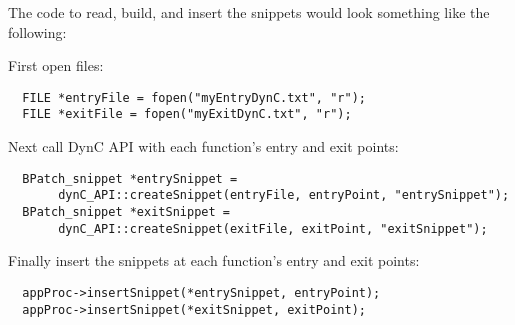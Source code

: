 \documentclass{article}
\begin{document}

\noindent The code to read, build, and insert the snippets would look something like the following:

\noindent First open files:
\begin{lstlisting}
  FILE *entryFile = fopen("myEntryDynC.txt", "r");
  FILE *exitFile = fopen("myExitDynC.txt", "r");
\end{lstlisting}

\noindent Next call DynC API with each function's entry and exit points:
\begin{lstlisting}
  BPatch_snippet *entrySnippet = 
       dynC_API::createSnippet(entryFile, entryPoint, "entrySnippet");
  BPatch_snippet *exitSnippet = 
       dynC_API::createSnippet(exitFile, exitPoint, "exitSnippet");
\end{lstlisting}

\noindent Finally insert the snippets at each function's entry and exit points:
\begin{lstlisting}
  appProc->insertSnippet(*entrySnippet, entryPoint);
  appProc->insertSnippet(*exitSnippet, exitPoint);
\end{lstlisting}

\begin{comment}
\begin{lstlisting}
/*** Create Snippet ***/
// build entryString
std::stringstream entryString;
entryString << "static int intCounter;" << endl;
entryString << "inf`printf(\"Entering %s, which has been called %d times.\\n\"";
entryString << ",dyninst`function_name, intCounter);";

// call to DynC API
BPatch_snippet *entrySnippet = 
       dynC_API::createSnippet(entryString.str().c_str(), entryPoint, "entrySnippet");

// build exitString
std::stringstream exitString;
exitString << "inf`printf(\"Exiting %s.\\n\", dyninst`function_name);";

// call to DynC API
BPatch_snippet *exitSnippet = 
       dynC_API::createSnippet(exitString.str().c_str(), app, "exitSnippet");
/*** Finish Snippet ***/

// find all entry and exit points
std::vector<BPatch_point *> * entry_points = (*functions)[0]->findPoint(BPatch_entry);
std::vector<BPatch_point *> * exit_points = (*functions)[0]->findPoint(BPatch_exit);

for(unsigned int i = 1; i < functions->size(); i++){
  entry_points->push_back((*(*functions)[i]->findPoint(BPatch_entry))[0]);
  exit_points->push_back((*(*functions)[i]->findPoint(BPatch_exit))[0]);
}

// insert Snippets
appProc->insertSnippet(*entrySnippet, entry_points);
appProc->insertSnippet(*exitSnippet, exit_points);
  
//run mutatee
appProc->continueExecution();

\end{lstlisting}
\end{comment}
\end{document}
